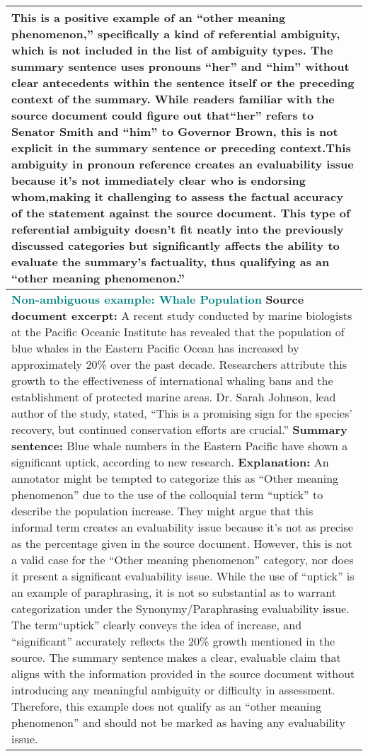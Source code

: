 \begin{table*}
\begin{tabular}{@{}p{14cm}@{}}
This is a positive example of an “other meaning phenomenon,” specifically a kind of referential ambiguity, which is not included in the list of ambiguity types. The summary sentence uses pronouns “her” and “him” without clear antecedents within the sentence itself or the preceding context of the summary. While readers familiar with the source document could figure out that“her” refers to Senator Smith and “him” to Governor Brown, this is not explicit in the summary sentence or preceding context.This ambiguity in pronoun reference creates an evaluability issue because it’s not immediately clear who is endorsing whom,making it challenging to assess the factual accuracy of the statement against the source document. This type of referential ambiguity doesn’t fit neatly into the previously discussed categories but significantly affects the ability to evaluate the summary’s factuality, thus qualifying as an “other meaning phenomenon.”
\\
\midrule
\textbf{\textcolor{teal}{Non-ambiguous example: Whale Population}}
\newline
\textbf{Source document excerpt:}
A recent study conducted by marine biologists at the Pacific Oceanic Institute has revealed that the population of blue whales in the Eastern Pacific Ocean has increased by approximately 20\% over the past decade. Researchers attribute this growth to the effectiveness of international whaling bans and the establishment of protected marine areas. Dr. Sarah Johnson, lead author of the study, stated, “This is a promising sign for the species’ recovery, but continued conservation efforts are crucial.”
\newline
\textbf{Summary sentence:}
Blue whale numbers in the Eastern Pacific have shown a significant uptick, according to new research.
\newline
\textbf{Explanation:}
An annotator might be tempted to categorize this as “Other meaning phenomenon” due to the use of the colloquial term “uptick” to describe the population increase. They might argue that this informal term creates an evaluability issue because it’s not as precise as the percentage given in the source document. However, this is not a valid case for the “Other meaning phenomenon” category, nor does it present a significant evaluability issue. While the use of “uptick” is an example of paraphrasing, it is not so substantial as to warrant categorization under the Synonymy/Paraphrasing evaluability issue. The term“uptick” clearly conveys the idea of increase, and “significant” accurately reflects the 20\% growth mentioned in the source. The summary sentence makes a clear, evaluable claim that aligns with the information provided in the source document without introducing any meaningful ambiguity or difficulty in assessment. Therefore, this example does not qualify as an “other meaning phenomenon” and should not be marked as having any evaluability issue.

\end{tabular}
\end{table*}
